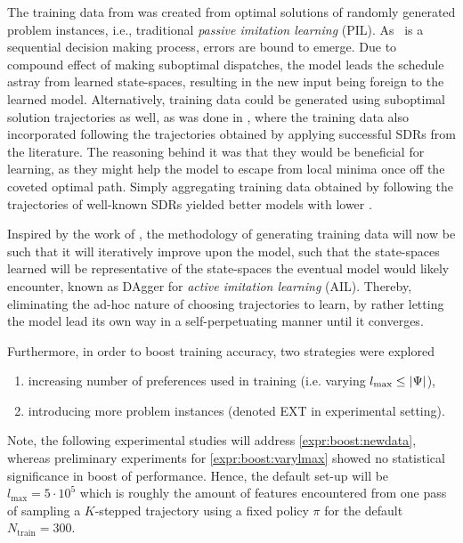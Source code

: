 \documentclass[twocolumn]{svjour3}
\begin{document}
The training data from \cite{InRu11a} was created from optimal solutions of 
randomly generated problem instances, i.e., traditional \emph{passive
imitation learning} (PIL). 
As \JSP\ is a sequential decision making process, errors are bound to emerge. 
Due to compound effect of making suboptimal dispatches, the model leads the 
schedule astray from learned state-spaces, resulting in the new input being 
foreign to the learned model. 
Alternatively, training data could be generated using suboptimal solution 
trajectories as well, as was done in \cite{InRu15a}, where the training data 
also incorporated following the trajectories obtained by applying successful 
SDRs from the literature. 
The reasoning behind it was that they would be beneficial for learning, 
as they might help the model to escape from local minima once off the coveted 
optimal path. 
Simply aggregating training data obtained by following the trajectories of 
well-known SDRs yielded better models with lower \namerho. 

Inspired by the work of \cite{RossB10,RossGB11}, the methodology of generating 
training data will now be such that it will iteratively improve upon the model, 
such that the state-spaces learned will be representative of the state-spaces 
the eventual model would likely encounter, known as DAgger for \emph{active 
imitation learning} (AIL).
Thereby, eliminating the ad-hoc nature of choosing trajectories to learn, by 
rather letting the model lead its own way in a self-perpetuating manner until 
it converges.

Furthermore, in order to boost training accuracy, two strategies were explored 
\begin{enumerate}[after={{}}, leftmargin=*,
label={\textbf{Boost.\arabic*}}, ref={{Boost.\arabic*}}]
\item \label{expr:boost:varylmax} increasing number of preferences used 
in training (i.e. varying \mbox{$l_{\max} \leq \lvert\Psi\rvert$}),
\item \label{expr:boost:newdata} introducing more problem instances (denoted 
EXT in experimental setting).
\end{enumerate}
Note, the following experimental studies will address 
\ref{expr:boost:newdata}, whereas preliminary experiments for 
\ref{expr:boost:varylmax} showed no statistical significance in boost of 
performance. Hence, the default set-up will be $l_{\max}=5 \cdot 10^5$ which is 
roughly the amount of features encountered from one pass of sampling a 
\mbox{$K$-stepped} trajectory using a fixed policy $\pi$ for the default 
$N_{\text{train}}=300$. 
\end{document}
